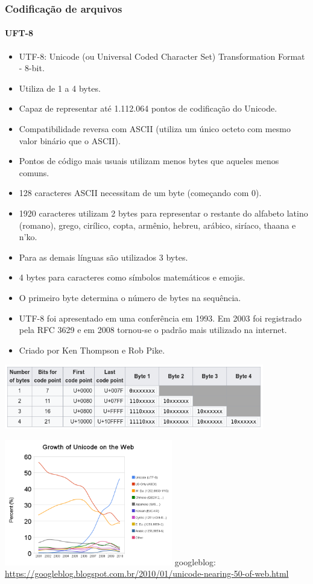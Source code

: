 \begin{frame}[allowframebreaks]
\frametitle{Codificação de arquivos}
\framesubtitle{UFT-8}
  \begin{itemize}
  \item UTF-8: Unicode (ou Universal Coded Character Set) Transformation Format - 8-bit.
  \item Utiliza de 1 a 4 bytes.
  \item Capaz de representar até 1.112.064 pontos de codificação do Unicode.
  \item Compatibilidade reversa com ASCII (utiliza um único octeto com mesmo valor binário que o ASCII).
  \item Pontos de código mais usuais utilizam menos bytes que aqueles menos comuns.
  \item 128 caracteres ASCII necessitam de um byte (começando com 0). 
  \item 1920 caracteres utilizam 2 bytes para representar o restante do alfabeto latino (romano),
        grego, cirílico, copta, armênio, hebreu, arábico, siríaco, thaana e n'ko.
  \item Para as demais línguas são utilizados 3 bytes.
  \item 4 bytes para caracteres como símbolos matemáticos e emojis.
  \item O primeiro byte determina o número de bytes na sequência.
  \item UTF-8 foi apresentado em uma conferência em 1993. Em 2003 foi registrado pela RFC 3629 e 
        em 2008 tornou-se o padrão mais utilizado na internet.
  \item Criado por Ken Thompson e Rob Pike.
  \end{itemize}


  \includegraphics[width=0.85\textwidth,height=0.35\textheight,keepaspectratio]{figures/utf8bytes.png}

  {
  \centering
  \includegraphics[width=0.55\textwidth,height=0.8\textheight,keepaspectratio]{figures/unicodeweb.png} 
  }
  \footnotesize{googleblog: \url{https://googleblog.blogspot.com.br/2010/01/unicode-nearing-50-of-web.html}}
  


\end{frame}
